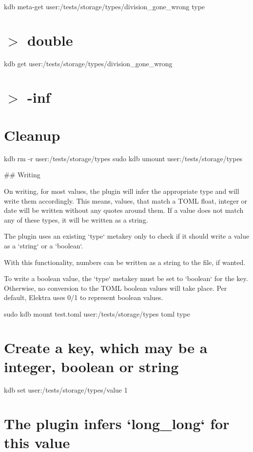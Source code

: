 kdb meta-\/get \textquotesingle{}user\+:/tests/storage/types/division\+\_\+gone\+\_\+wrong\textquotesingle{} \textquotesingle{}type\textquotesingle{} \hypertarget{autotoc_md642_autotoc_md660}{}\section{$>$ double}\label{autotoc_md642_autotoc_md660}
kdb get \textquotesingle{}user\+:/tests/storage/types/division\+\_\+gone\+\_\+wrong\textquotesingle{} \hypertarget{autotoc_md642_autotoc_md661}{}\section{$>$ -\/inf}\label{autotoc_md642_autotoc_md661}
\hypertarget{autotoc_md642_autotoc_md662}{}\section{Cleanup}\label{autotoc_md642_autotoc_md662}
kdb rm -\/r user\+:/tests/storage/types sudo kdb umount user\+:/tests/storage/types 
\begin{DoxyCode}
## Writing

On writing, for most values, the plugin will infer the appropriate type and will write them accordingly.
This means, values, that match a TOML float, integer or date will be written without any quotes around
       them.
If a value does not match any of these types, it will be written as a string.

The plugin uses an existing `type` metakey only to check if it should write a value as a `string` or a
       `boolean`.

With this functionality, numbers can be written as a string to the file, if wanted.

To write a boolean value, the `type` metakey must be set to `boolean` for the key.
Otherwise, no conversion to the TOML boolean values will take place.
Per default, Elektra uses 0/1 to represent boolean values.
\end{DoxyCode}
 sudo kdb mount test.\+toml user\+:/tests/storage/types toml type\hypertarget{autotoc_md642_autotoc_md663}{}\section{Create a key, which may be a integer, boolean or string}\label{autotoc_md642_autotoc_md663}
kdb set \textquotesingle{}user\+:/tests/storage/types/value\textquotesingle{} \textquotesingle{}1\textquotesingle{}\hypertarget{autotoc_md642_autotoc_md664}{}\section{The plugin infers `long\+\_\+long` for this value}\label{autotoc_md642_autotoc_md664}
